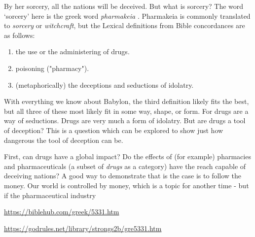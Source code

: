 \documentclass[10pt]{article}
\begin{document}
\begin{multicols}{2}
By her sorcery, all the nations will be deceived. But what is sorcery? The word `sorcery' here is the greek word \textit{pharmakeia} \cite{pharmakeia}. Pharmakeia is commonly translated to \textit{sorcery} or \textit{witchcraft}, but the Lexical definitions from Bible concordances are as follows:
\begin{enumerate}\itemsep0em 
\item the use or the administering of drugs.
\item poisoning ("pharmacy").
\item (metaphorically) the deceptions and seductions of idolatry.
\end{enumerate}
With everything we know about Babylon, the third definition likely fits the best, but all three of these most likely fit in some way, shape, or form. For drugs are a way of seductions. Drugs are very much a form of idolatry. But are drugs a tool of deception? This is a question which can be explored to show just how dangerous the tool of deception can be.

First, can drugs have a global impact? Do the effects of (for example) pharmacies and pharmaceuticals (a subset of \textit{drugs} as a category) have the reach capable of deceiving nations? A good way to demonstrate that is the case is to follow the money. Our world is controlled by money, which is a topic for another time - but if the pharmaceutical industry 

\begin{thebibliography}{9}
	{\footnotesize
		
	 \url{https://biblehub.com/greek/5331.htm}
	
	 \url{https://godrules.net/library/strongs2b/gre5331.htm}
	
	}
\end{thebibliography}

\end{multicols}


\end{document}
